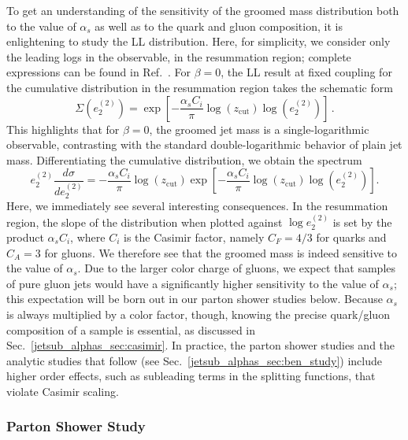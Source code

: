 \documentclass[11pt]{cernrep}
\begin{document}
To get an understanding of the sensitivity of the groomed mass distribution both to the value of $\alpha_s$ as well as to the quark and gluon composition, it is enlightening to study the LL distribution.
%
Here, for simplicity, we consider only the leading logs in the observable, in the resummation region; complete expressions can be found in Ref.~\cite{Larkoski:2014wba,Frye:2016aiz,Marzani:2017kqd,Marzani:2017mva}.
%
For $\beta=0$, the LL result at fixed coupling for the cumulative distribution in the resummation region takes the schematic form
%
\begin{equation}
\Sigma(e_2^{(2)})=\exp\left[ - \frac{\alpha_s C_i}{\pi} \log(z_{\mathrm{cut}} ) \log (e_2^{(2)}) \right]\,.
\end{equation}
%
This highlights that for $\beta=0$, the groomed jet mass is a single-logarithmic observable, contrasting with the standard double-logarithmic behavior of plain jet mass.
%
Differentiating the cumulative distribution, we obtain the spectrum
%
\begin{equation}
\label{jetsub_alphas_eq:ecf_ll_dsitribution}
e_2^{(2)} \frac{d\sigma}{d e_2^{(2)}}=   - \frac{\alpha_s C_i}{\pi} \log(z_{\mathrm{cut}} )   \exp\left[ - \frac{\alpha_s C_i}{\pi}  \log(z_{\mathrm{cut}} ) \log (e_2^{(2)}) \right].
\end{equation}
%
Here, we immediately see several interesting consequences.
%
In the resummation region, the slope of the distribution when plotted against $\log e_2^{(2)}$ is set by the product $\alpha_s C_i$, where $C_i$ is the Casimir factor, namely $C_F = 4/3$ for quarks and $C_A = 3$ for gluons.
%
We therefore see that the groomed mass is indeed sensitive to the value of $\alpha_s$.
%
Due to the larger color charge of gluons, we expect that samples of pure gluon jets would have a significantly higher sensitivity to the value of $\alpha_s$; this expectation will be born out in our parton shower studies below.
%
Because $\alpha_s$ is always multiplied by a color factor, though, knowing the precise quark/gluon composition of a sample is essential, as discussed in Sec.~\ref{jetsub_alphas_sec:casimir}.
%
In practice, the parton shower studies and the analytic studies that follow (see Sec.~\ref{jetsub_alphas_sec:ben_study}) include higher order effects, such as subleading terms in the splitting functions, that violate Casimir scaling.

\subsubsection{Parton Shower Study}
\end{document}
